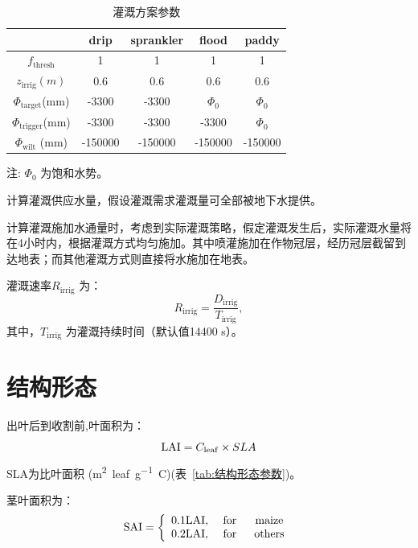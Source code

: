 \begin{table}[htbp]
  \centering
  \caption{灌溉方案参数}
  \label{tab:灌溉方案参数}
  \begin{threeparttable}
  \begin{tabular}{@{}ccccc}
  \toprule
        & drip   & sprankler   & flood   & paddy   \\ \midrule
$f_{\mathrm{thresh}}$ & 1  & 1 & 1  & 1 \\
$z_{\mathrm{irrig}}(m)$ & 0.6  & 0.6  & 0.6  & 0.6  \\
$\Phi_{\mathrm{target}}$(mm) & -3300    & -3300  & $\Phi_0$ & $\Phi_0$  \\
$\Phi_{\mathrm{trigger}}$(mm) & -3300 & -3300 & -3300  & $\Phi_0$  \\
$\Phi_{\mathrm{wilt}}$ (mm)   & -150000    & -150000    & -150000    & -150000   \\\bottomrule
\end{tabular}
\begin{tablenotes}
    \footnotesize
    \item[注:] $\Phi_0$ 为饱和水势。
\end{tablenotes}
\end{threeparttable}
\end{table}

计算灌溉供应水量，假设灌溉需求灌溉量可全部被地下水提供。

计算灌溉施加水通量时，考虑到实际灌溉策略，假定灌溉发生后，实际灌溉水量将在4小时内，根据灌溉方式均匀施加。其中喷灌施加在作物冠层，经历冠层截留到达地表；而其他灌溉方式则直接将水施加在地表。

灌溉速率$R_{\mathrm{irrig}}$ 为：
\begin{equation}
    R_{\mathrm{irrig}} = \frac{D_{\mathrm{irrig}}}{T_{\mathrm{irrig}}},
\end{equation}
其中，$T_{\mathrm{irrig}}$ 为灌溉持续时间（默认值14400 s）。
\section{结构形态}
出叶后到收割前,叶面积为：
\begin{equation}
{\rm LAI}=C_{\mathrm{leaf}} \times SLA
\end{equation}
SLA为比叶面积 (\unit{m^2.leaf.g^{-1}.C})(表~\ref{tab:结构形态参数})。

茎叶面积为：
\begin{equation}
{\rm SAI}=\left\{\begin{array}{lcc}0.1 {\rm LAI}, & \text { for } & \text { maize } \\
   0.2 {\rm LAI}, & \text { for } & \text {others}\end{array}\right.
\end{equation}


